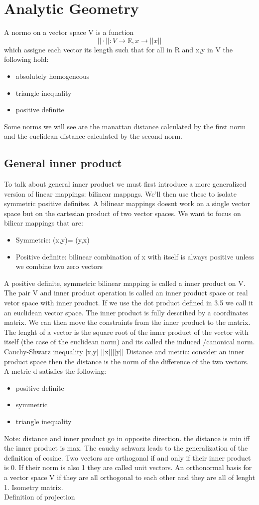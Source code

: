 \section*{Analytic Geometry}
A normo on a vector space V is a function \[ 
    ||\cdot||: V \longrightarrow \mathbb{R},
    x \longrightarrow ||x|| 
\]
which assigne each vector its length such that for all \lambda in R and x,y in V the following hold:
\begin{itemize}
    \item absolutely homogeneous
    \item triangle inequality
    \item positive definite
\end{itemize}
Some norms we will see are the manattan distance calculated by the first norm and the euclidean distance calculated by the second norm.
\subsection{General inner product}
To talk about general inner product we must first introduce a more generalized version of linear mappings: bilinear mappngs. We'll then use these to isolate symmetric positive definites. A bilinear mappings doesnt work on a single vector space but on the cartesian product of two vector spaces. We want to focus on biliear mappings that are: \begin{itemize}
    \item Symmetric: \omega(x,y)= \omega(y,x)
    \item Positive definite: bilinear combination of x with itself is always positive unless we combine two zero vectors
\end{itemize}
A positive definite, symmetric bilinear mapping is called a inner product on V. The pair V and inner product operation is called an inner product space or real vetor space with inner product. If we use the dot product defined in 3.5 we call it an euclidean vector space. The inner product is fully described by a coordinates matrix. We can then move the constraints from the inner product to the matrix. The lenght of a vector is the square root of the inner product of the vector with itself (the case of the euclidean norm) and its called the induced /canonical norm.
Cauchy-Shwarz inequality |\angle x,y\angle | \leq ||x||||y||
Distance and metric: 
consider an inner product space then the distance is the norm of the difference of the two vectors. A metric d satisfies the following:\begin{itemize}
    \item positive definite
    \item symmetric
    \item triangle inequality
\end{itemize}
Note: distance and inner product go in opposite direction. the distance is min iff the inner product is max. The cauchy schwarz leads to the generalization of the definition of cosine. Two vectors are orthogonal if and only if their inner product is 0. If their norm is also 1 they are called unit vectors.
An orthonormal basis for a vector space V if they are all orthogonal to each other and they are all of lenght 1.
Isometry matrix.\\
Definition of projection